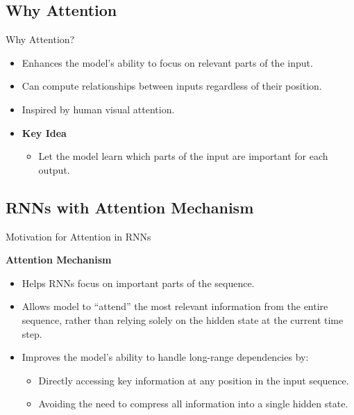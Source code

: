 \documentclass[serif, aspectratio=169]{beamer}
\begin{document}
\subsection{Why Attention}
\begin{frame}{Why Attention?}
	\begin{itemize}
		\item Enhances the model's ability to focus on relevant parts of the input.
		\item Can compute relationships between inputs regardless of their position.
		\item Inspired by human visual attention.
		\item \textbf{Key Idea}
		\begin{itemize}
			\item Let the model learn which parts of the input are important for each output.
		\end{itemize}
	\end{itemize}
\end{frame}

\subsection{RNNs with Attention Mechanism}
\begin{frame}{Motivation for Attention in RNNs}
	
	\textbf{Attention Mechanism}
	\begin{itemize}
		\item Helps RNNs focus on important parts of the sequence.
		\item Allows model to “attend” the most relevant information from the entire sequence, rather than relying solely on the hidden state at the current time step.
		\item Improves the model's ability to handle long-range dependencies by:
		\begin{itemize}
			\item Directly accessing key information at any position in the input sequence.
			\item Avoiding the need to compress all information into a single hidden state.
		\end{itemize}
	\end{itemize}
\end{frame}
\end{document}
